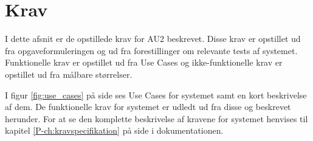 \chapter{Krav}\label{ch:Krav} %

I dette afsnit er de opstillede krav for AU2 beskrevet.
Disse krav er opstillet ud fra opgaveformuleringen og ud fra forestillinger om relevante tests af systemet. 
Funktionelle krav er opstillet ud fra Use Cases og ikke-funktionelle krav er opstillet ud fra målbare størrelser.

I figur \ref{fig:use_cases} på side \pageref{fig:use_cases} ses Use Cases for systemet samt en kort beskrivelse af dem. 
De funktionelle krav for systemet er udledt ud fra disse og beskrevet herunder. 
For at se den komplette beskrivelse af kravene for systemet henvises til kapitel \ref{P-ch:kravspecifikation}  på side \pageref{P-ch:kravspecifikation} i dokumentationen.

